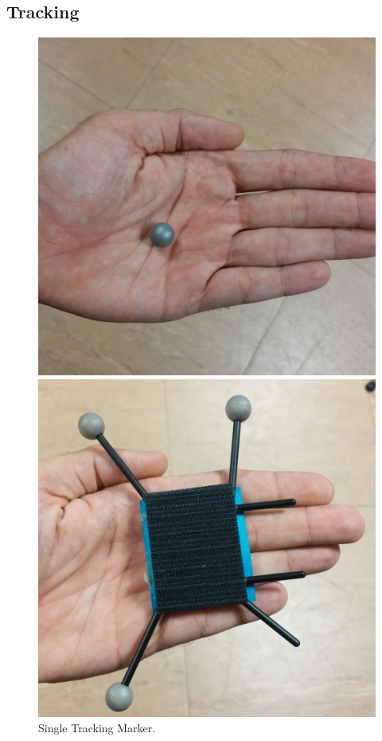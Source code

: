 \subsection{Tracking}
\label{prototype-tracking}

\begin{figure}
  \centering
  \includegraphics[width=\linewidth]{imgs/impl/singlemarker.png}
    \caption{Single Tracking Marker.}
    \label{fig:singlemarker}
    \endminipage\hfill
{}
  \centering
  \includegraphics[width=\linewidth]{imgs/impl/markercombination.png}

\end{figure}
